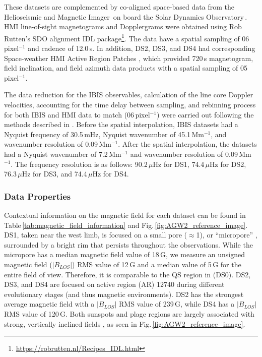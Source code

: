 \documentclass[preprint2,linenumbers]{aastex701}
\begin{document}
These datasets are complemented by co-aligned space-based data from the Helioseismic and Magnetic Imager\,\citep[HMI;][]{HMI_instrumental} on board the Solar Dynamics Observatory\,\citep[SDO;][]{SDO_2012}.
HMI line-of-sight magnetograms and Dopplergrams were obtained using Rob Rutten's SDO alignment IDL package\footnote[2]{\href{https://robrutten.nl/Recipes_IDL.html}{https://robrutten.nl/Recipes\_IDL.html}}.
The data have a spatial sampling of 0{\farcs}6\,pixel$^{-1}$ and cadence of 12.0\,s.
In addition, DS2, DS3, and DS4 had corresponding Space-weather HMI Active Region Patches \citep[SHARPs;][]{2014_Hoeksema, 2014_Bobra}, which provided 720\,s magnetogram, field inclination, and field azimuth data products with a spatial sampling of 0{\farcs}5\,pixel$^{-1}$.

The data reduction for the IBIS observables, calculation of the line core Doppler velocities, accounting for the time delay between sampling, and rebinning process for both IBIS and HMI data to match (0{\farcs}6\,pixel$^{-1}$) were carried out following the methods described in .
Before the spatial interpolation, IBIS datasets had a Nyquist frequency of 30.5\,mHz, Nyquist wavenumber of 45.1\,Mm$^{-1}$, and wavenumber resolution of 0.09\,Mm$^{-1}$.
After the spatial interpolation, the datasets had a Nyquist wavenumber of 7.2\,Mm$^{-1}$ and wavenumber resolution of 0.09\,Mm$^{-1}$.
The frequency resolution is as follows: 90.2\,$\mu$Hz for DS1, 74.4\,$\mu$Hz for DS2, 76.3\,$\mu$Hz for DS3, and 74.4\,$\mu$Hz for DS4.

\subsubsection{Data Properties} \label{subsubsec:data_properties}


Contextual information on the magnetic field for each dataset can be found in Table\,\ref{tab:magnetic_field_information} and Fig.\,\ref{fig:AGW2_reference_image}.
DS1, taken near the west limb, is focused on a small pore ($\approx$1{\arcsec}), or ``micropore'' \citep{2019_Solovev_Parfinenko_Efremov_et_al}, surrounded by a bright rim that persists throughout the observations.
While the micropore has a median magnetic field value of 18\,G, we measure an unsigned magnetic field ($|B_{LOS}|$) RMS value of 12\,G and a median value of 5\,G for the entire field of view.
Therefore, it is comparable to the QS region in  (DS0).
DS2, DS3, and DS4 are focused on active region (AR) 12740 during different evolutionary stages (and thus magnetic environments).
DS2 has the strongest average magnetic field with a $|B_{LOS}|$ RMS value of 239\,G, while DS4 has a $|B_{LOS}|$ RMS value of 120\,G.
Both sunspots and plage regions are largely associated with strong, vertically inclined fields \citep{2011_Borrero_Ichimoto, 2020_Pietrow_Kiselman_etal}, as seen in Fig.\,\ref{fig:AGW2_reference_image}.
\end{document}

